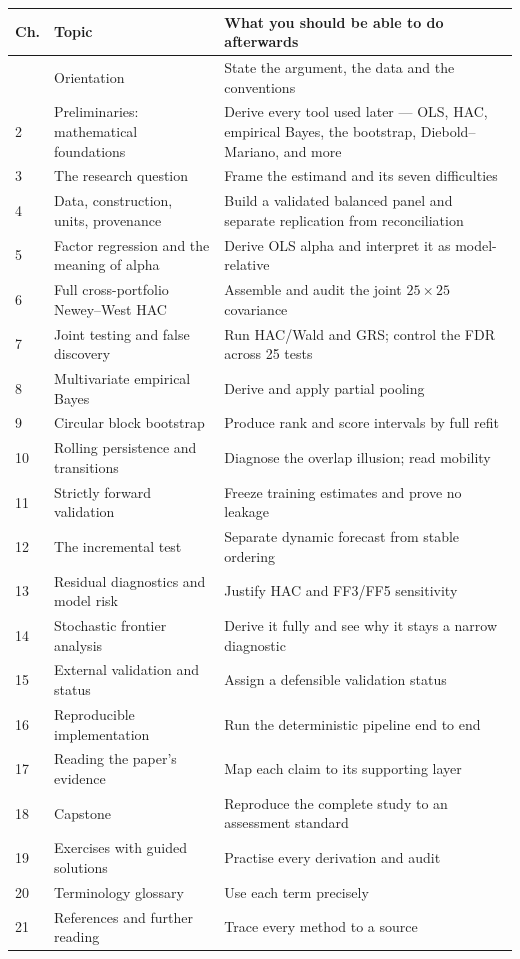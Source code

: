 \begin{longtable}[]{@{}p{}p{}p{}@{}}
\toprule\noalign{}
Ch. & Topic & What you should be able to do afterwards \\
\midrule\noalign{}
\endhead
\bottomrule\noalign{}
\endlastfoot
1 & Orientation & State the argument, the data and the conventions \\
2 & Preliminaries: mathematical foundations & Derive every tool used later
--- OLS, HAC, empirical Bayes, the bootstrap, Diebold--Mariano, and more \\
3 & The research question & Frame the estimand and its seven difficulties \\
4 & Data, construction, units, provenance & Build a validated balanced
panel and separate replication from reconciliation \\
5 & Factor regression and the meaning of alpha & Derive OLS alpha and
interpret it as model-relative \\
6 & Full cross-portfolio Newey--West HAC & Assemble and audit the joint
$25\times25$ covariance \\
7 & Joint testing and false discovery & Run HAC/Wald and GRS; control the
FDR across 25 tests \\
8 & Multivariate empirical Bayes & Derive and apply partial pooling \\
9 & Circular block bootstrap & Produce rank and score intervals by full
refit \\
10 & Rolling persistence and transitions & Diagnose the overlap illusion;
read mobility \\
11 & Strictly forward validation & Freeze training estimates and prove no
leakage \\
12 & The incremental test & Separate dynamic forecast from stable ordering \\
13 & Residual diagnostics and model risk & Justify HAC and FF3/FF5
sensitivity \\
14 & Stochastic frontier analysis & Derive it fully and see why it stays
a narrow diagnostic \\
15 & External validation and status & Assign a defensible validation
status \\
16 & Reproducible implementation & Run the deterministic pipeline
end to end \\
17 & Reading the paper's evidence & Map each claim to its supporting layer \\
18 & Capstone & Reproduce the complete study to an assessment standard \\
19 & Exercises with guided solutions & Practise every derivation and audit \\
20 & Terminology glossary & Use each term precisely \\
21 & References and further reading & Trace every method to a source \\
\end{longtable}

